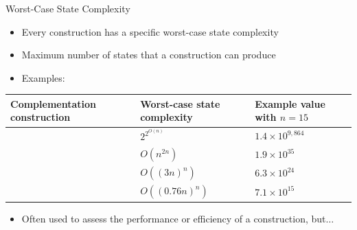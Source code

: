 \documentclass[12pt]{beamer}
\begin{document}
\def\sep{5pt}
\begin{frame}{Worst-Case State Complexity}
\begin{itemize} \itemsep\sep
\item Every construction has a specific worst-case state complexity
\item Maximum number of states that a construction can produce
\pause
\item Examples:
\end{itemize}
\centering
{\footnotesize
\renewcommand{\arraystretch}{1.4}
\renewcommand{\tabcolsep}{0.4cm}
\begin{tabular}{p{3cm}p{2.4cm}p{2.1cm}}
\hline 
Complementation construction & Worst-case state complexity & Example value with $n = 15$ \\
\hline
\cite{buchi1960decision} & $2^{2^{O\left(n\right)}}$ & $1.4 \times 10^{9,864}$ \\
\cite{2007_piterman} & $O(n^{2n})$ & $1.9 \times 10^{35}$ \\
\cite{vardi2007automata} & $O((3n)^n)$ & $6.3 \times 10^{24}$ \\
\cite{schewe2009buchi} & $O((0.76n)^n)$ & $7.1 \times 10^{15}$ \\
\hline
\end{tabular}}
\vspace{\sep}\vspace{2pt}
\begin{itemize}
\pause  
\item Often used to assess the performance or efficiency of a construction, but$\dots$
\end{itemize}
\end{frame}
\end{document}
